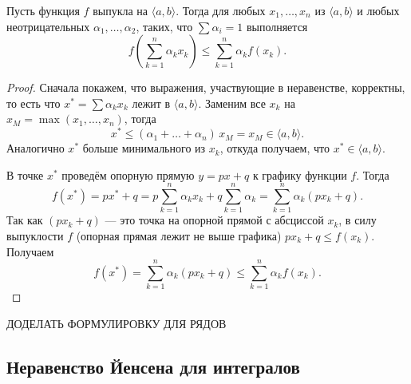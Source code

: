 \begin{theorem} \hypertarget{Йенсен-суммы}{}
	Пусть функция \(f\) выпукла на \(\langle a, b \rangle\). Тогда для любых \(x_1, \ldots, x_n\) из \(\langle a, b \rangle\) и любых неотрицательных \(\alpha_1, \ldots, \alpha_2\), таких, что \(\sum \alpha_i = 1\) выполняется \[
	f \left(\sum_{k=1}^n \alpha_k x_k \right) \leqslant \sum_{k=1}^n \alpha_k f(x_k). 
	\]
\end{theorem}
\begin{proof}
	Сначала покажем, что выражения, участвующие в неравенстве, корректны, то есть что \(x^* = \sum \alpha_k x_k\) лежит в  \(\langle a, b \rangle\). Заменим все \(x_k\) на \(x_M = \max(x_1, \ldots, x_n)\), тогда \[
	x^* \leqslant (\alpha_1 + \ldots + \alpha_n) \, x_M = x_M \in \langle a, b \rangle.
	\]
	Аналогично \(x^*\) больше минимального из \(x_k\), откуда получаем, что \(x^* \in \langle a, b \rangle\).
	
	В точке \(x^*\) проведём опорную прямую \(y = px + q\) к графику функции \(f\). Тогда \[
	f(x^*) = px^* + q = p \sum_{k=1}^n \alpha_k x_k + q \sum_{k=1}^n \alpha_k = \sum_{k=1}^n \alpha_k (px_k + q).
	\]
	Так как \((px_k + q)\) --- это точка на опорной прямой с абсциссой \(x_k\), в силу выпуклости \(f\) (опорная прямая лежит не выше графика) \(px_k + q \leqslant f(x_k)\). Получаем \[
	f(x^*) = \sum_{k=1}^n \alpha_k (px_k + q) \leqslant \sum_{k=1}^n \alpha_k f(x_k).
	\]
\end{proof}

ДОДЕЛАТЬ ФОРМУЛИРОВКУ ДЛЯ РЯДОВ

\subsection{Неравенство Йенсена для интегралов}

